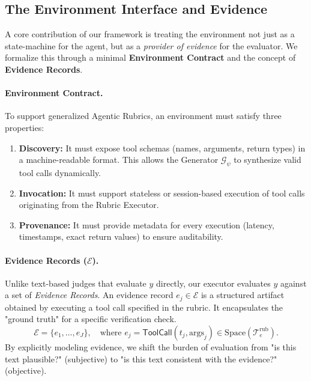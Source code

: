 \subsection{The Environment Interface and Evidence}
\label{sec:env_interface}

A core contribution of our framework is treating the environment not just as a state-machine for the agent, but as a \textit{provider of evidence} for the evaluator.
We formalize this through a minimal \textbf{Environment Contract} and the concept of \textbf{Evidence Records}.

\paragraph{Environment Contract.}
To support generalized Agentic Rubrics, an environment must satisfy three properties:
\begin{enumerate}
    \item \textbf{Discovery:} It must expose tool schemas (names, arguments, return types) in a machine-readable format. This allows the Generator $\mathcal{G}_\psi$ to synthesize valid tool calls dynamically.
    \item \textbf{Invocation:} It must support stateless or session-based execution of tool calls originating from the Rubric Executor.
    \item \textbf{Provenance:} It must provide metadata for every execution (latency, timestamps, exact return values) to ensure auditability.
\end{enumerate}

\paragraph{Evidence Records ($\mathcal{E}$).}
Unlike text-based judges that evaluate $y$ directly, our executor evaluates $y$ against a set of \textit{Evidence Records}.
An evidence record $e_j \in \mathcal{E}$ is a structured artifact obtained by executing a tool call specified in the rubric.
It encapsulates the "ground truth" for a specific verification check.
\begin{equation}
\mathcal{E} = \{ e_1, \dots, e_J \}, \quad \text{where } e_j = \mathsf{ToolCall}(t_j, \text{args}_j) \in \text{Space}(\mathcal{T}_e^{\text{rub}}).
\end{equation}
By explicitly modeling evidence, we shift the burden of evaluation from "is this text plausible?" (subjective) to "is this text consistent with the evidence?" (objective).

